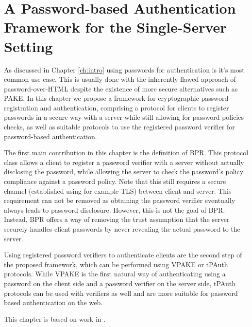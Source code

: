 \chapter[A Password Authentication Framework for the Single-Server Setting]{A Password-based Authentication Framework for the Single-Server Setting} \label{ch:vpake}

As discussed in Chapter \ref{ch:intro} using passwords for authentication is it's most common use case. 
This is usually done with the inherently flawed approach of password-over-\ac{HTML} despite the existence of more secure alternatives such as \ac{PAKE}.
In this chapter we propose a framework for cryptographic password registration and authentication, comprising a protocol for clients to register passwords in a secure way with a server while still allowing for password policies checks, as well as suitable protocols to use the registered password verifier for password-based authentication.

The first main contribution in this chapter is the definition of \ac{BPR}.
This protocol class allows a client to register a password verifier with a server without actually disclosing the password, while allowing the server to check the password's policy compliance against a password policy.
Note that this still requires a secure channel (established using for example \ac{TLS}) between client and server.
This requirement can not be removed as obtaining the password verifier eventually always leads to password disclosure.
However, this is not the goal of \ac{BPR}.
Instead, \ac{BPR} offers a way of removing the trust assumption that the server securely handles client passwords by never revealing the actual password to the server.

Using registered password verifiers to authenticate clients are the second step of the proposed framework, which can be performed using \ac{VPAKE} or \ac{tPAuth} protocols.
While \ac{VPAKE} is the first natural way of authenticating using a password on the client side and a password verifier on the server side, \ac{tPAuth} protocols can be used with verifiers as well and are more suitable for password based authentication on the web.
 
\smallskip
\noindent
This chapter is based on work in \cite{Kiefer13a,KieferM15a,DongK15a}.
 
